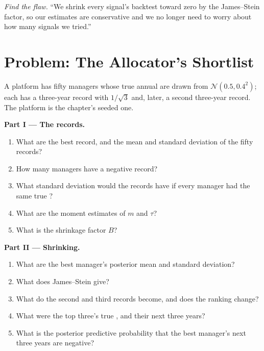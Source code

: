 \begin{exercise}[$\star\star\star$]\label{exo:qm:bayesian-methods:8}
\emph{Find the flaw.} ``We shrink every signal's backtest  toward zero by the James--Stein factor, so our estimates are
conservative and we no longer need to worry about how many signals we tried.''
\end{exercise}

\section{Problem: The Allocator's Shortlist}

\begin{problem}\label{pb:qm:bayesian-methods:1}
A platform has fifty managers whose true annual  are drawn from $\mathcal N(0.5, 0.4^2)$; each has a three-year record with
 $1/\sqrt3$ and, later, a second three-year record. The platform is the chapter's seeded one.

\medskip\noindent\textbf{Part I --- The records.}
\begin{enumerate}
\item What are the best record, and the mean and standard deviation of the fifty records?
\item How many managers have a negative record?
\item What standard deviation would the records have if every manager had the same true ?
\item What are the moment estimates of $m$ and $\tau$?
\item What is the shrinkage factor $B$?
\end{enumerate}

\medskip\noindent\textbf{Part II --- Shrinking.}
\begin{enumerate}[resume]
\item What are the best manager's posterior mean and standard deviation?
\item What does James--Stein give?
\item What do the second and third records become, and does the ranking change?
\item What were the top three's true , and their next three years?
\item What is the posterior predictive probability that the best manager's next three years are negative?
\end{enumerate}


\end{problem}
